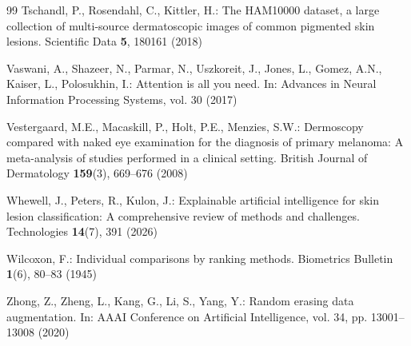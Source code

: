 \documentclass[runningheads]{llncs}
\begin{document}
\begin{thebibliography}{99}
Tschandl, P., Rosendahl, C., Kittler, H.: The HAM10000 dataset, a large collection of multi-source dermatoscopic images of common pigmented skin lesions. Scientific Data \textbf{5}, 180161 (2018)

Vaswani, A., Shazeer, N., Parmar, N., Uszkoreit, J., Jones, L., Gomez, A.N., Kaiser, L., Polosukhin, I.: Attention is all you need. In: Advances in Neural Information Processing Systems, vol. 30 (2017)

Vestergaard, M.E., Macaskill, P., Holt, P.E., Menzies, S.W.: Dermoscopy compared with naked eye examination for the diagnosis of primary melanoma: A meta-analysis of studies performed in a clinical setting. British Journal of Dermatology \textbf{159}(3), 669--676 (2008)

Whewell, J., Peters, R., Kulon, J.: Explainable artificial intelligence for skin lesion classification: A comprehensive review of methods and challenges. Technologies \textbf{14}(7), 391 (2026)

Wilcoxon, F.: Individual comparisons by ranking methods. Biometrics Bulletin \textbf{1}(6), 80--83 (1945)

Zhong, Z., Zheng, L., Kang, G., Li, S., Yang, Y.: Random erasing data augmentation. In: AAAI Conference on Artificial Intelligence, vol. 34, pp. 13001--13008 (2020)

\end{thebibliography}
\end{document}
